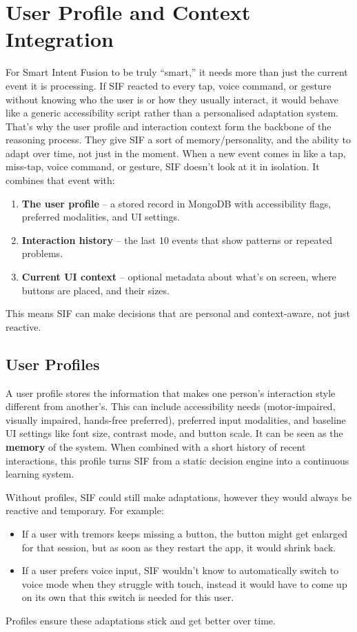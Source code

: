 \section{User Profile and Context Integration}
For Smart Intent Fusion to be truly “smart,” it needs more than just the current event it is processing. If SIF reacted to every tap, voice command, or gesture without knowing who the user is or how they usually interact, it would behave like a generic accessibility script rather than a personalised adaptation system. That’s why the user profile and interaction context form the backbone of the reasoning process. They give SIF a sort of memory/personality, and the ability to adapt over time, not just in the moment.
When a new event comes in like a tap, miss-tap, voice command, or gesture, SIF doesn’t look at it in isolation. It combines that event with:
\begin{enumerate}
    \item \textbf{The user profile} – a stored record in MongoDB with accessibility flags, preferred modalities, and UI settings.
    \item \textbf{Interaction history} – the last 10 events that show patterns or repeated problems.
    \item \textbf{Current UI context} – optional metadata about what’s on screen, where buttons are placed, and their sizes.
\end{enumerate}
This means SIF can make decisions that are personal and context-aware, not just reactive.

\subsection{User Profiles}
A user profile stores the information that makes one person’s interaction style different from another’s.
This can include accessibility needs (motor-impaired, visually impaired, hands-free preferred), preferred input modalities, and baseline UI settings like font size, contrast mode, and button scale. It can be seen as the \textbf{memory} of the system.
When combined with a short history of recent interactions, this profile turns SIF from a static decision engine into a continuous learning system. 

Without profiles, SIF could still make adaptations, however they would always be reactive and temporary.
For example:
\begin{itemize}
    \item If a user with tremors keeps missing a button, the button might get enlarged for that session, but as soon as they restart the app, it would shrink back.
    \item If a user prefers voice input, SIF wouldn’t know to automatically switch to voice mode when they struggle with touch, instead it would have to come up on its own that this switch is needed for this user.
\end{itemize}
Profiles ensure these adaptations stick and get better over time.

